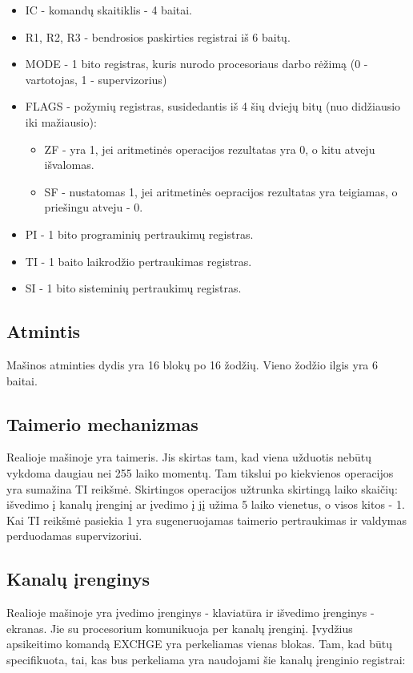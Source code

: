 \documentclass{VUMIFInfKursinis}
\begin{document}
\begin{itemize}
	\item IC - komandų skaitiklis - 4 baitai.
	\item R1, R2, R3 - bendrosios paskirties registrai iš 6 baitų.
	\item MODE - 1 bito registras, kuris nurodo procesoriaus darbo rėžimą (0 - vartotojas, 1 - supervizorius)
	\item FLAGS - požymių  registras, susidedantis iš 4 šių dviejų bitų (nuo didžiausio iki mažiausio): 
	\begin{itemize}
		\item ZF - yra 1, jei aritmetinės operacijos rezultatas yra 0, o kitu atveju išvalomas.
		\item SF - nustatomas 1, jei aritmetinės oepracijos rezultatas yra teigiamas, o priešingu atveju - 0.
	\end{itemize}
	\item PI - 1 bito programinių pertraukimų registras.
	\item TI - 1 baito laikrodžio pertraukimas registras.
	\item SI - 1 bito sisteminių pertraukimų registras.
\end{itemize}

\subsection{Atmintis}

Mašinos atminties dydis yra 16 blokų po 16 žodžių. Vieno žodžio ilgis yra 6 baitai.

\subsection{Taimerio mechanizmas}
Realioje mašinoje yra taimeris. Jis skirtas tam, kad viena užduotis nebūtų vykdoma daugiau nei 255 laiko momentų. Tam tikslui po kiekvienos operacijos yra sumažina TI reikšmė. Skirtingos operacijos užtrunka skirtingą laiko skaičių: išvedimo į kanalų įrenginį ar įvedimo į jį užima 5 laiko vienetus, o visos kitos - 1. Kai TI reikšmė pasiekia 1 yra sugeneruojamas taimerio pertraukimas ir valdymas perduodamas supervizoriui.

\subsection{Kanalų įrenginys}

Realioje mašinoje yra įvedimo įrenginys - klaviatūra ir išvedimo įrenginys - ekranas. Jie su procesorium komunikuoja per kanalų įrenginį. Įvydžius apsikeitimo komandą EXCHGE yra perkeliamas vienas blokas. Tam, kad būtų specifikuota, tai, kas bus perkeliama yra naudojami šie kanalų įrenginio registrai:
\end{document}
